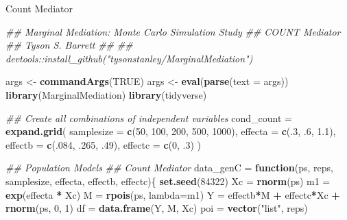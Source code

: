 \documentclass[]{DissertateCUNY}
\newenvironment{Shaded}{\begin{snugshade}}{\end{snugshade}}
\newcommand{\CommentTok}[1]{\textcolor[rgb]{0.56,0.35,0.01}{\textit{#1}}}
\newcommand{\ControlFlowTok}[1]{\textcolor[rgb]{0.13,0.29,0.53}{\textbf{#1}}}
\newcommand{\DataTypeTok}[1]{\textcolor[rgb]{0.13,0.29,0.53}{#1}}
\newcommand{\DecValTok}[1]{\textcolor[rgb]{0.00,0.00,0.81}{#1}}
\newcommand{\FloatTok}[1]{\textcolor[rgb]{0.00,0.00,0.81}{#1}}
\newcommand{\KeywordTok}[1]{\textcolor[rgb]{0.13,0.29,0.53}{\textbf{#1}}}
\newcommand{\NormalTok}[1]{#1}
\newcommand{\OperatorTok}[1]{\textcolor[rgb]{0.81,0.36,0.00}{\textbf{#1}}}
\newcommand{\OtherTok}[1]{\textcolor[rgb]{0.56,0.35,0.01}{#1}}
\newcommand{\StringTok}[1]{\textcolor[rgb]{0.31,0.60,0.02}{#1}}
\begin{document}
\normalsize

Count Mediator

\small

\begin{Shaded}
\begin{Highlighting}[]
\CommentTok{## Marginal Mediation: Monte Carlo Simulation Study}
\CommentTok{##   COUNT Mediator}
\CommentTok{## Tyson S. Barrett}
\CommentTok{##}
\CommentTok{## devtools::install_github("tysonstanley/MarginalMediation")}

\NormalTok{args <-}\StringTok{ }\KeywordTok{commandArgs}\NormalTok{(}\OtherTok{TRUE}\NormalTok{)}
\NormalTok{args <-}\StringTok{ }\KeywordTok{eval}\NormalTok{(}\KeywordTok{parse}\NormalTok{(}\DataTypeTok{text =}\NormalTok{ args))}
\KeywordTok{library}\NormalTok{(MarginalMediation)}
\KeywordTok{library}\NormalTok{(tidyverse)}

\CommentTok{## Create all combinations of independent variables}
\NormalTok{cond_count =}\StringTok{ }\KeywordTok{expand.grid}\NormalTok{(}
  \DataTypeTok{samplesize =} \KeywordTok{c}\NormalTok{(}\DecValTok{50}\NormalTok{, }\DecValTok{100}\NormalTok{, }\DecValTok{200}\NormalTok{, }\DecValTok{500}\NormalTok{, }\DecValTok{1000}\NormalTok{),}
  \DataTypeTok{effecta    =} \KeywordTok{c}\NormalTok{(.}\DecValTok{3}\NormalTok{, }\FloatTok{.6}\NormalTok{, }\FloatTok{1.1}\NormalTok{),}
  \DataTypeTok{effectb    =} \KeywordTok{c}\NormalTok{(.}\DecValTok{084}\NormalTok{, }\FloatTok{.265}\NormalTok{, }\FloatTok{.49}\NormalTok{),}
  \DataTypeTok{effectc    =} \KeywordTok{c}\NormalTok{(}\DecValTok{0}\NormalTok{, }\FloatTok{.3}\NormalTok{)}
\NormalTok{)}

\CommentTok{## Population Models}
\CommentTok{## Count Mediator}
\NormalTok{data_genC =}\StringTok{ }\ControlFlowTok{function}\NormalTok{(ps, reps, samplesize, effecta, effectb, effectc)\{}
  \KeywordTok{set.seed}\NormalTok{(}\DecValTok{84322}\NormalTok{)}
\NormalTok{  Xc =}\StringTok{ }\KeywordTok{rnorm}\NormalTok{(ps)}
\NormalTok{  m1 =}\StringTok{ }\KeywordTok{exp}\NormalTok{(effecta }\OperatorTok{*}\StringTok{ }\NormalTok{Xc)}
\NormalTok{  M  =}\StringTok{ }\KeywordTok{rpois}\NormalTok{(ps, }\DataTypeTok{lambda=}\NormalTok{m1)}
\NormalTok{  Y  =}\StringTok{ }\NormalTok{effectb}\OperatorTok{*}\NormalTok{M }\OperatorTok{+}\StringTok{ }\NormalTok{effectc}\OperatorTok{*}\NormalTok{Xc }\OperatorTok{+}\StringTok{ }\KeywordTok{rnorm}\NormalTok{(ps, }\DecValTok{0}\NormalTok{, }\DecValTok{1}\NormalTok{)}
\NormalTok{  df =}\StringTok{ }\KeywordTok{data.frame}\NormalTok{(Y, M, Xc)}
\NormalTok{  poi  =}\StringTok{ }\KeywordTok{vector}\NormalTok{(}\StringTok{"list"}\NormalTok{, reps)}
  

\end{Highlighting}
\end{Shaded}
\end{document}
